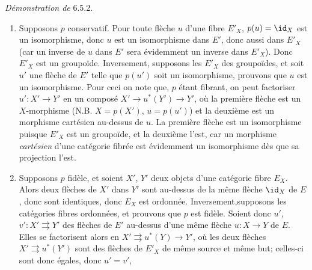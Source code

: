 \noindent \emph{Démonstration de} 6.5.2.
\begin{enumerate}
\renewcommand{\theenumi}{\roman{enumi}}
\renewcommand{\labelenumi}{(\theenumi)}
\item Supposons $p$ conservatif. Pour toute flèche $u$ d'une fibre
  $E'_X$, $p(u)=\id_X$ est un isomorphisme, donc $u$ est un
  isomorphisme dans $E'$, donc aussi dans $E'_X$ (car un inverse de
  $u$ dans $E'$ sera évidemment un inverse dans $E'_X$). Donc $E'_X$
  est un groupoïde. Inversement, supposons les $E'_X$ des
  groupoïdes, et soit $u'$ une flèche de $E'$ telle que $p(u')$
  soit un isomorphisme, prouvons que $u$ est un isomorphisme. Pour
  ceci on note que, $p$ étant fibrant, on peut factoriser
  $u':X'\rightarrow Y'$ en un composé $X'\rightarrow
  u^\ast(Y')\rightarrow Y'$, où la première flèche est un
  $X$-morphisme (N.B. $X=p(X')$, $u=p(u')$) et la deuxième est un
  morphisme cartésien au-dessus de $u$. La première flèche est
  un isomorphisme puisque $E'_X$ est un groupoïde, et la deuxième
  l'est, car un morphisme \emph{cartésien} %
d'une catégorie fibrée
  est évidemment un isomorphisme dès que sa projection l'est.

\item Supposons $p$ fidèle, et soient $X'$, $Y'$ deux objets d'une
  catégorie fibre $E_X$. Alors deux flèches de $X'$ dans $Y'$ sont
  au-dessus de la même flèche $\id_X$ de $E$, donc sont identiques,
  donc $E_X$ est ordonnée. Inversement,\pageoriginale supposons les
  catégories fibres ordonnées, et prouvons que $p$ est
  fidèle. Soient donc $u'$, $v':X'\rightrightarrows Y'$ des
  flèches de $E'$ au-dessus d'une même flèche $u:X\rightarrow Y$
  de $E$. Elles se factorisent alors en $X'\rightrightarrows
  u^\ast(Y)\rightarrow Y'$, où les deux flèches
  $X'\rightrightarrows u^\ast(Y')$ sont des flèches de $E'_X$ de
  même source et même but; celles-ci sont donc égales, donc
  $u'=v'$, \cqfd
\end{enumerate}

